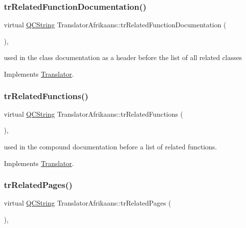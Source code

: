 \subsubsection{\texorpdfstring{trRelatedFunctionDocumentation()}{trRelatedFunctionDocumentation()}}
{\footnotesize\ttfamily virtual \mbox{\hyperlink{class_q_c_string}{Q\+C\+String}} Translator\+Afrikaans\+::tr\+Related\+Function\+Documentation (\begin{DoxyParamCaption}{ }\end{DoxyParamCaption})\hspace{0.3cm}{\ttfamily [inline]}, {\ttfamily [virtual]}}

used in the class documentation as a header before the list of all related classes 

Implements \mbox{\hyperlink{class_translator}{Translator}}.

\mbox{\label{class_translator_afrikaans_a3e7a330ea930856da0fd73308d21dfcd}} 
\subsubsection{\texorpdfstring{trRelatedFunctions()}{trRelatedFunctions()}}
{\footnotesize\ttfamily virtual \mbox{\hyperlink{class_q_c_string}{Q\+C\+String}} Translator\+Afrikaans\+::tr\+Related\+Functions (\begin{DoxyParamCaption}{ }\end{DoxyParamCaption})\hspace{0.3cm}{\ttfamily [inline]}, {\ttfamily [virtual]}}

used in the compound documentation before a list of related functions. 

Implements \mbox{\hyperlink{class_translator}{Translator}}.

\mbox{\label{class_translator_afrikaans_a923a96eabdebf5f6a5e6dc3a59f6ed88}} 
\subsubsection{\texorpdfstring{trRelatedPages()}{trRelatedPages()}}
{\footnotesize\ttfamily virtual \mbox{\hyperlink{class_q_c_string}{Q\+C\+String}} Translator\+Afrikaans\+::tr\+Related\+Pages (\begin{DoxyParamCaption}{ }\end{DoxyParamCaption})\hspace{0.3cm}{\ttfamily [inline]}, {\ttfamily [virtual]}}


